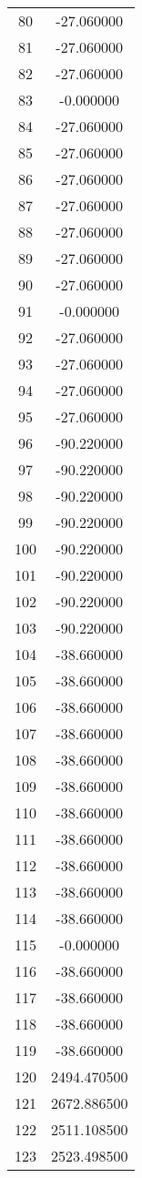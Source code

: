 \documentclass[12pt]{article}
\begin{document}
\begin{longtable}{@{}cc@{}}
80 & -27.060000 \\
81 & -27.060000 \\
82 & -27.060000 \\
83 & -0.000000 \\
84 & -27.060000 \\
85 & -27.060000 \\
86 & -27.060000 \\
87 & -27.060000 \\
88 & -27.060000 \\
89 & -27.060000 \\
90 & -27.060000 \\
91 & -0.000000 \\
92 & -27.060000 \\
93 & -27.060000 \\
94 & -27.060000 \\
95 & -27.060000 \\
96 & -90.220000 \\
97 & -90.220000 \\
98 & -90.220000 \\
99 & -90.220000 \\
100 & -90.220000 \\
101 & -90.220000 \\
102 & -90.220000 \\
103 & -90.220000 \\
104 & -38.660000 \\
105 & -38.660000 \\
106 & -38.660000 \\
107 & -38.660000 \\
108 & -38.660000 \\
109 & -38.660000 \\
110 & -38.660000 \\
111 & -38.660000 \\
112 & -38.660000 \\
113 & -38.660000 \\
114 & -38.660000 \\
115 & -0.000000 \\
116 & -38.660000 \\
117 & -38.660000 \\
118 & -38.660000 \\
119 & -38.660000 \\
120 & 2494.470500 \\
121 & 2672.886500 \\
122 & 2511.108500 \\
123 & 2523.498500 \\

\end{longtable}
\end{document}
